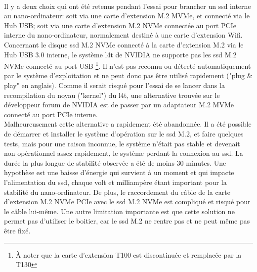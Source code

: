 \vspace{\baselineskip}
\\
\noindent Il y a deux choix qui ont été retenus pendant l'essai pour brancher un \acrshort{ssd} interne au nano-ordinateur: soit via une carte d'extension M.2 MVMe, et connecté via le Hub USB; soit via une carte d'extension M.2 NVMe connectée au port PCIe interne du nano-ordinateur, normalement destiné à une carte d'extension Wifi.
\vspace{\baselineskip}
\\
\noindent Concernant le disque \acrshort{ssd} M.2 NVMe connecté à la carte d'extension M.2 via le Hub USB 3.0 interne, le système \acrshort{l4t} de NVIDIA ne supporte pas les \acrshort{ssd} M.2 NVMe connecté au port USB \footnote{À noter que la carte d'extension T100 est discontinuée et remplacée par la T130}. Il n'est pas reconnu ou détecté automatiquement par le système d'exploitation et ne peut donc pas être utilisé rapidement ("plug \& play" en anglais). Comme il serait risqué pour l'essai de se lancer dans la recompilation du noyau ("kernel") du \acrshort{l4t}, une alternative trouvée sur le développeur forum de NVIDIA est de passer par un adaptateur M.2 MVMe connecté au port PCIe interne.
\vspace{\baselineskip}
\\
\noindent Malheureusement cette alternative a rapidement été abandonnée. Il a été possible de démarrer et installer le système d'opération sur le \acrshort{ssd} M.2, et faire quelques tests, mais pour une raison inconnue, le système n'était pas stable et devenait non opérationnel assez rapidement, le système perdant la connexion au \acrshort{ssd}. La durée la plus longue de stabilité observée a été de moins 30 minutes. Une hypothèse est une baisse d'énergie qui survient à un moment et qui impacte l'alimentation du \acrshort{ssd}, chaque volt et milliampère étant important pour la stabilité du nano-ordinateur. De plus, le raccordement du câble de la carte d'extension M.2 NVMe PCIe avec le \acrshort{ssd} M.2 NVMe est compliqué et risqué pour le câble lui-même. Une autre limitation importante est que cette solution ne permet pas d'utiliser le boitier, car le \acrshort{ssd} M.2 ne rentre pas et ne peut même pas être fixé. 
